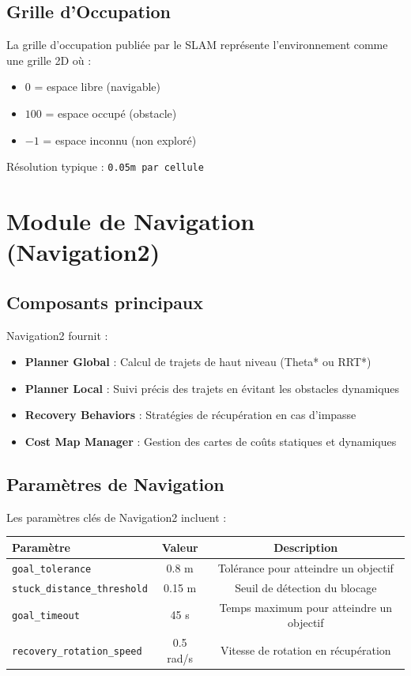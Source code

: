 \documentclass[12pt,a4paper,oneside]{report}
\begin{document}
\subsection{Grille d'Occupation}

La grille d'occupation publiée par le SLAM représente l'environnement comme une grille 2D où :
\begin{itemize}
  \item $0$ = espace libre (navigable)
  \item $100$ = espace occupé (obstacle)
  \item $-1$ = espace inconnu (non exploré)
\end{itemize}

Résolution typique : \texttt{0.05m par cellule}

\section{Module de Navigation (Navigation2)}

\subsection{Composants principaux}

Navigation2 fournit :

\begin{itemize}
  \item \textbf{Planner Global} : Calcul de trajets de haut niveau (Theta* ou RRT*)
  \item \textbf{Planner Local} : Suivi précis des trajets en évitant les obstacles dynamiques
  \item \textbf{Recovery Behaviors} : Stratégies de récupération en cas d'impasse
  \item \textbf{Cost Map Manager} : Gestion des cartes de coûts statiques et dynamiques
\end{itemize}

\subsection{Paramètres de Navigation}

Les paramètres clés de Navigation2 incluent :

\begin{table}[H]
\centering
\begin{tabular}{|l|c|c|}
\hline
\textbf{Paramètre} & \textbf{Valeur} & \textbf{Description} \\
\hline
\texttt{goal\_tolerance} & 0.8 m & Tolérance pour atteindre un objectif \\
\texttt{stuck\_distance\_threshold} & 0.15 m & Seuil de détection du blocage \\
\texttt{goal\_timeout} & 45 s & Temps maximum pour atteindre un objectif \\
\texttt{recovery\_rotation\_speed} & 0.5 rad/s & Vitesse de rotation en récupération \\
\hline
\end{tabular}
\end{table}
\end{document}
